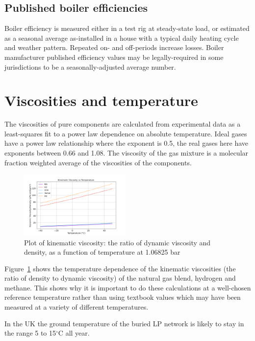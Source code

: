 \documentclass[5p]{elsarticle} %
\begin{document}
\subsection{Published boiler efficiencies}
Boiler efficiency\citep{Bennet2017} is measured either in a test rig at steady-state load, or estimated as a seasonal average as-installed in a house with a typical daily heating cycle and weather pattern. Repeated on- and off-periods increase losses\citep{saty2018}. 
Boiler manufacturer published efficiency values may be legally-required in some jurisdictions to be a seasonally-adjusted average number.

\section{Viscosities and temperature}
\label{sec:viscosities}

The viscosities of pure components are calculated from experimental data as a least-squares fit to a power law dependence on absolute temperature. 
Ideal gases have a power law relationship where the exponent is 0.5, the real gases here have exponents between 0.66 and 1.08. The viscosity of the gas mixture is a molecular fraction weighted average\citep{Krieger1951} of the viscosities of the components.

\begin{figure}[htb]
\centering
\includegraphics[width=0.49\textwidth]{peng_re.png}
\caption{Plot of kinematic viscosity: the ratio of dynamic viscosity and density, as a function of temperature at 1.06825 bar}
\label{fig:peng_re}
\end{figure}

Figure~\ref{fig:peng_re} shows the temperature dependence of the kinematic viscosities (the ratio of density to dynamic viscosity) of the natural gas blend, hydrogen and methane. This shows why it is important to do these calculations at a well-chosen reference temperature rather than using textbook values which may have been measured at a variety of different temperatures.

In the UK the ground temperature of the buried LP network is likely to stay in the range 5 to 15$^\circ$C all year\citep{MacKay2008}.
\end{document}
